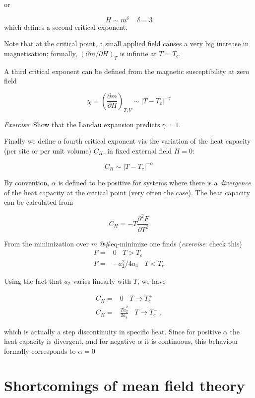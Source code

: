\documentclass[
  letterpaper,
  enabledeprecatedfontcommands]{report}
\begin{document}
or

\[H \sim m^\delta ~~~~~ \delta=3\] which defines a second critical
exponent.

Note that at the critical point, a small applied field causes a very big
increase in magnetisation; formally, \((\partial m/\partial H)_T\) is
infinite at \(T=T_c\).

A third critical exponent can be defined from the magnetic
susceptibility at zero field

\[\chi=\left(\frac{\partial m}{\partial H}\right)_{T,V} \sim |T-T_c|^{-\gamma}\]

\emph{Exercise}: Show that the Landau expansion predicts \(\gamma=1\).

Finally we define a fourth critical exponent via the variation of the
heat capacity (per site or per unit volume) \(C_H\), in fixed external
field \(H=0\):

\[C_H \sim |T-T_c|^{-\alpha}\]

By convention, \(\alpha\) is defined to be positive for systems where
there is a \emph{divergence} of the heat capacity at the critical point
(very often the case). The heat capacity can be calculated from

\[C_H =-T\frac{\partial^2 F}{\partial T^2}\]

From the minimization over \(m\) @\#eq-minimize one finds
(\emph{exercise}: check this) \[
\begin{aligned}
F = & 0 ~~~~T>T_c\nonumber\\
F = & -a_2^2/4a_4 ~~~~ T < T_c
\end{aligned} 
\]

Using the fact that \(a_2\) varies linearly with \(T\), we have

\[
\begin{aligned}
C_H =& 0 ~~~~ T\to T_c^+\nonumber\\
C_H =& \frac{T\tilde a_2^2}{2a_4} ~~~~ T \to T_c^-\:,
\end{aligned} 
\]

which is actually a step discontinuity in specific heat. Since for
positive \(\alpha\) the heat capacity is divergent, and for negative
\(\alpha\) it is continuous, this behaviour formally corresponds to
\(\alpha=0\)

\section{Shortcomings of mean field
theory}\label{shortcomings-of-mean-field-theory}
\end{document}
